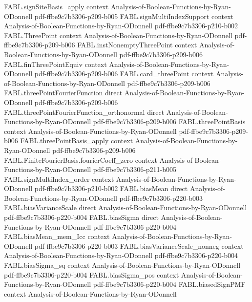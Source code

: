 \begin{theorem}
\proofstep
  {FABL.signSiteBasis_apply}
  {context}
  {Analysis-of-Boolean-Functions-by-Ryan-ODonnell}
  {pdf-ffbe9c7b3306-p209-b005}
\proofstep
  {FABL.signMultiIndexSupport}
  {context}
  {Analysis-of-Boolean-Functions-by-Ryan-ODonnell}
  {pdf-ffbe9c7b3306-p210-b002}
\proofstep
  {FABL.ThreePoint}
  {context}
  {Analysis-of-Boolean-Functions-by-Ryan-ODonnell}
  {pdf-ffbe9c7b3306-p209-b006}
\proofstep
  {FABL.instNonemptyThreePoint}
  {context}
  {Analysis-of-Boolean-Functions-by-Ryan-ODonnell}
  {pdf-ffbe9c7b3306-p209-b006}
\proofstep
  {FABL.finThreePointEquiv}
  {context}
  {Analysis-of-Boolean-Functions-by-Ryan-ODonnell}
  {pdf-ffbe9c7b3306-p209-b006}
\proofstep
  {FABL.card_threePoint}
  {context}
  {Analysis-of-Boolean-Functions-by-Ryan-ODonnell}
  {pdf-ffbe9c7b3306-p209-b006}
\proofstep
  {FABL.threePointFourierFunction}
  {direct}
  {Analysis-of-Boolean-Functions-by-Ryan-ODonnell}
  {pdf-ffbe9c7b3306-p209-b006}
\proofstep
  {FABL.threePointFourierFunction_orthonormal}
  {direct}
  {Analysis-of-Boolean-Functions-by-Ryan-ODonnell}
  {pdf-ffbe9c7b3306-p209-b006}
\proofstep
  {FABL.threePointBasis}
  {context}
  {Analysis-of-Boolean-Functions-by-Ryan-ODonnell}
  {pdf-ffbe9c7b3306-p209-b006}
\proofstep
  {FABL.threePointBasis_apply}
  {context}
  {Analysis-of-Boolean-Functions-by-Ryan-ODonnell}
  {pdf-ffbe9c7b3306-p209-b006}
\proofstep
  {FABL.FiniteFourierBasis.fourierCoeff_zero}
  {context}
  {Analysis-of-Boolean-Functions-by-Ryan-ODonnell}
  {pdf-ffbe9c7b3306-p211-b005}
\proofstep
  {FABL.signMultiIndex_order}
  {context}
  {Analysis-of-Boolean-Functions-by-Ryan-ODonnell}
  {pdf-ffbe9c7b3306-p210-b002}
\proofstep
  {FABL.biasMean}
  {direct}
  {Analysis-of-Boolean-Functions-by-Ryan-ODonnell}
  {pdf-ffbe9c7b3306-p220-b003}
\proofstep
  {FABL.biasVarianceScale}
  {direct}
  {Analysis-of-Boolean-Functions-by-Ryan-ODonnell}
  {pdf-ffbe9c7b3306-p220-b004}
\proofstep
  {FABL.biasSigma}
  {direct}
  {Analysis-of-Boolean-Functions-by-Ryan-ODonnell}
  {pdf-ffbe9c7b3306-p220-b004}
\proofstep
  {FABL.biasMean_mem_Icc}
  {context}
  {Analysis-of-Boolean-Functions-by-Ryan-ODonnell}
  {pdf-ffbe9c7b3306-p220-b003}
\proofstep
  {FABL.biasVarianceScale_nonneg}
  {context}
  {Analysis-of-Boolean-Functions-by-Ryan-ODonnell}
  {pdf-ffbe9c7b3306-p220-b004}
\proofstep
  {FABL.biasSigma_sq}
  {context}
  {Analysis-of-Boolean-Functions-by-Ryan-ODonnell}
  {pdf-ffbe9c7b3306-p220-b004}
\proofstep
  {FABL.biasSigma_pos}
  {context}
  {Analysis-of-Boolean-Functions-by-Ryan-ODonnell}
  {pdf-ffbe9c7b3306-p220-b004}
\proofstep
  {FABL.biasedSignPMF}
  {context}
  {Analysis-of-Boolean-Functions-by-Ryan-ODonnell}

\end{theorem}
